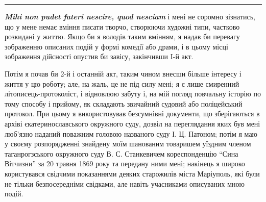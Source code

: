 \documentclass[a4paper,20pt]{report}
\begin{document}

\par\noindent\rule{\textwidth}{0.4pt}

\textbf{\em Mihi non pudet fateri nescire, quod nesciam} і мені не соромно
зізнатись, що у мене немає вміння писати творчо, створюючи художні типи,
частково розкидані у життю. Якщо би я володів таким вмінням, я надав би
перевагу зображенню описаних подій у формі комедії або драми, і в цьому місці
зображення дійсності опустив би завісу, закінчивши I-й акт.

Потім я почав би 2-й і останній акт, таким чином внесши більше інтересу і життя у цю роботу;
але, на жаль, це не під силу мені; я є лише смиренний літописець-протоколіст, і відновлюю забуту і,
на мій погляд повчальну історію по тому способу і прийому, як складають
звичайний судовий або поліцейський протокол. При цьому я використовував безсумнівні документи, що зберігаються
в архіві єкатеринославського окружного суду, дозвіл на переглядання яких був мені люб'язно наданий поважним
головою названого суду І. Ц. Патоном; потім я маю у своєму розпорядженні знайдену моїм шанованим 
товаришем уїздним членом таганрогзського окружного суду В. С. Станкевичем кореспонденцію ``Сина Вітчизни''
за 20 травня 1869 року та передану ними мені; накінець я широко користувався свідчими показаннями деяких старожилів міста Маріуполь,
які були не тільки безпосередніми свідками, але навіть учасниками описуваних мною подій.
\end{document}
